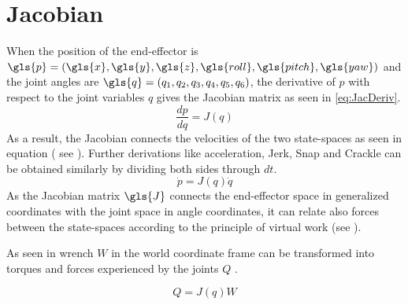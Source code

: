 \section{Jacobian} \label{sec:Jacobian}
When the position of the end-effector is $\gls{p}=(\gls{x},\gls{y},\gls{z},\gls{roll},\gls{pitch},\gls{yaw})$ and the joint angles are  $\gls{q}=(q_1, q_2, q_3, q_4, q_5, q_6)$, the derivative of $p$ with respect to the joint variables $q$ gives the Jacobian matrix as seen in  \ref{eq:JacDeriv}.\\
\begin{equation} \label{eq:JacDeriv}
	\frac{dp}{dq}=J(q)
\end{equation}
\medskip
As a result, the Jacobian connects the velocities of the two state-spaces as seen in equation  ( see \cite{CorkeRoboticVisionControl}). %
Further derivations like acceleration, Jerk, Snap and Crackle can be obtained similarly by dividing both sides through $dt$. \\
\begin{equation}\label{eq:JacVel}
	\dot{p}=J(q)\dot{q}
\end{equation}
As the Jacobian matrix $\gls{J}$ connects the end-effector space in generalized coordinates with the joint space in angle coordinates, it can relate also forces between the state-spaces according to the principle of virtual work (see \cite{IndustrialRobotArm}).%

As seen in  wrench $W$ in the world coordinate frame can be transformed into torques and forces experienced by the joints $Q$ \cite{CorkeRoboticVisionControl}.

\begin{equation} \label{eq:JacWrenchTorques}
	Q = J(q) W
\end{equation}